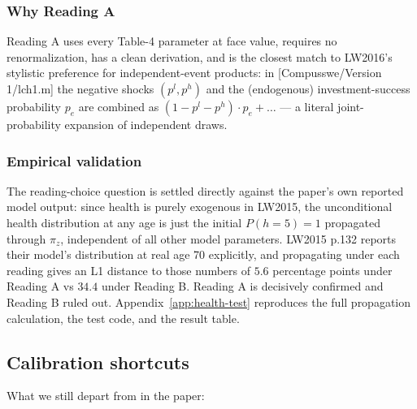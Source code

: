\subsubsection{Why Reading A}

Reading A uses every Table-4 parameter at face value, requires no renormalization, has a clean derivation, and is the closest match to LW2016's stylistic preference for independent-event products: in [Compusswe/Version 1/lch1.m] the negative shocks $(p^l, p^h)$ and the (endogenous) investment-success probability $p_e$ are combined as $(1-p^l-p^h) \cdot p_e + \ldots$ --- a literal joint-probability expansion of independent draws.

\subsubsection{Empirical validation}

The reading-choice question is settled directly against the paper's own reported model output: since health is purely exogenous in LW2015, the unconditional health distribution at any age is just the initial $P(h=5)=1$ propagated through $\pi_z$, independent of all other model parameters. LW2015 p.132 reports their model's distribution at real age 70 explicitly, and propagating under each reading gives an L1 distance to those numbers of $\mathbf{5.6}$ percentage points under Reading A vs $\mathbf{34.4}$ under Reading B. Reading A is decisively confirmed and Reading B ruled out. Appendix~\ref{app:health-test} reproduces the full propagation calculation, the test code, and the result table.


\subsection{Calibration shortcuts}

What we still depart from in the paper:


